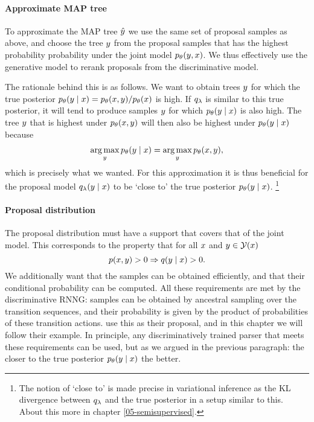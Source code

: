     \paragraph{Approximate MAP tree}
      To approximate the MAP tree $\hat{y}$ we use the same set of proposal samples as above, and choose the tree $y$ from the proposal samples that has the highest probability probability under the joint model $p_{\theta}( y, x)$. We thus effectively use the generative model to rerank proposals from the discriminative model.

      The rationale behind this is as follows. We want to obtain trees $y$ for which the true posterior $p_{\theta}(y \mid x) = p_{\theta}( x, y ) /p_{\theta}(x)$ is high. If $q_{\lambda}$ is similar to this true posterior, it will tend to produce samples $y$ for which $p_{\theta}(y \mid x)$ is also high. The tree $y$ that is highest under $p_{\theta}( x, y )$ will then also be highest under $ p_{\theta}( y \mid x )$ because
      \begin{align*}
        \operatorname*{arg\,max}_y p_{\theta}( y \mid x ) = \operatorname*{arg\,max}_y p_{\theta}(x, y),
      \end{align*}
      which is precisely what we wanted. For this approximation it is thus beneficial for the proposal model $q_{\lambda}(y \mid x)$ to be `close to' the true posterior $p_{\theta}(y \mid x)$. \footnote{The notion of `close to' is made precise in variational inference as the KL divergence between $q_{\lambda}$ and the true posterior in a setup similar to this. About this more in chapter \ref{05-semisupervised}.}

    \paragraph{Proposal distribution}
      The proposal distribution must have a support that covers that of the joint model. This corresponds to the property that for all $x$ and $y \in \mathcal{Y}(x)$
      \begin{equation*}
        p(x, y) > 0 \Rightarrow q( y \mid x ) > 0.
      \end{equation*}
      We additionally want that the samples can be obtained efficiently, and that their conditional probability can be computed. All these requirements are met by the discriminative RNNG: samples can be obtained by ancestral sampling over the transition sequences, and their probability is given by the product of probabilities of these transition actions. \citet{dyer2016rnng} use this as their proposal, and in this chapter we will follow their example. In principle, any discriminatively trained parser that meets these requirements can be used, but as we argued in the previous paragraph: the closer to the true posterior $p_{\theta}(y \mid x)$ the better.

